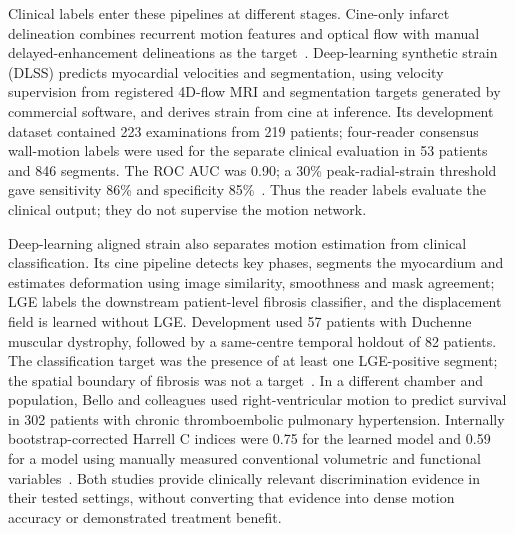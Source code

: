 Clinical labels enter these pipelines at different stages. Cine-only infarct delineation combines recurrent motion features and optical flow with manual delayed-enhancement delineations as the target~\cite{xu2018}. Deep-learning synthetic strain (DLSS) predicts myocardial velocities and segmentation, using velocity supervision from registered 4D-flow MRI and segmentation targets generated by commercial software, and derives strain from cine at inference. Its development dataset contained 223 examinations from 219 patients; four-reader consensus wall-motion labels were used for the separate clinical evaluation in 53 patients and 846 segments. The ROC AUC was 0.90; a 30\% peak-radial-strain threshold gave sensitivity 86\% and specificity 85\%~\cite{masutani2023dlss}. Thus the reader labels evaluate the clinical output; they do not supervise the motion network.

Deep-learning aligned strain also separates motion estimation from clinical classification. Its cine pipeline detects key phases, segments the myocardium and estimates deformation using image similarity, smoothness and mask agreement; LGE labels the downstream patient-level fibrosis classifier, and the displacement field is learned without LGE. Development used 57 patients with Duchenne muscular dystrophy, followed by a same-centre temporal holdout of 82 patients. The classification target was the presence of at least one LGE-positive segment; the spatial boundary of fibrosis was not a target~\cite{koehler2025alignedstrain}. In a different chamber and population, Bello and colleagues used right-ventricular motion to predict survival in 302 patients with chronic thromboembolic pulmonary hypertension. Internally bootstrap-corrected Harrell C indices were 0.75 for the learned model and 0.59 for a model using manually measured conventional volumetric and functional variables~\cite{bello2019}. Both studies provide clinically relevant discrimination evidence in their tested settings, without converting that evidence into dense motion accuracy or demonstrated treatment benefit.

